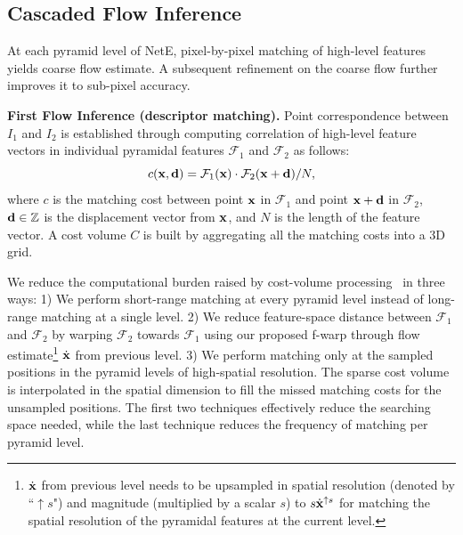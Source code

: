 \documentclass[10pt,twocolumn,letterpaper]{article}
\begin{document}
\subsection{Cascaded Flow Inference}
\label{sec:cascaded flow inference}
%
At each pyramid level of NetE, pixel-by-pixel matching of high-level features yields coarse flow estimate. A subsequent refinement on the coarse flow further improves it to sub-pixel accuracy.

\vspace{0.1cm}
\noindent \textbf{First Flow Inference (descriptor matching).} Point correspondence between $I_{1}$ and $I_{2}$ is established through computing correlation of high-level feature vectors in individual pyramidal features ${\mathcal F}_{1}$ and ${\mathcal F}_{2}$ as follows:
%
\begin{equation}\label{eq:matching cost}
c({\bf x},{\bf d}) = {\mathcal F}_{1}({\bf x}) \cdot {\mathcal F}_{2}({\bf x}+{\bf d}) / N,
\end{equation}
%
where $c$ is the matching cost between point ${\bf x}$ in ${\mathcal F}_{1}$ and point ${\bf x}+{\bf d}$ in ${\mathcal F}_{2}$, ${\bf d} \in {\mathbb Z}$ is the displacement vector from ${\bf x}$, and $N$ is the length of the feature vector. A cost volume $C$ is built by aggregating all the matching costs into a 3D grid.

We reduce the computational burden raised by cost-volume processing~\cite{Fischer15, Ilg17} in three ways: 1) We perform short-range matching at every pyramid level instead of long-range matching at a single level. 2) We reduce feature-space distance between ${\mathcal F}_{1}$ and ${\mathcal F}_{2}$ by warping ${\mathcal F}_{2}$ towards ${\mathcal F}_{1}$ using our proposed f-warp through flow estimate\footnote{$\dot{\bf x}$ from previous level needs to be upsampled in spatial resolution (denoted by ``$\uparrow$$s$") and magnitude (multiplied by a scalar $s$) to $s\dot{\bf x}^{\uparrow s}$ for matching the spatial resolution of the pyramidal features at the current level.} $\dot{\bf x}$ from previous level. 3) We perform matching only at the sampled positions in the pyramid levels of high-spatial resolution. The sparse cost volume is interpolated in the spatial dimension to fill the missed matching costs for the unsampled positions. The first two techniques effectively reduce the searching space needed, while the last technique reduces the frequency of matching per pyramid level. 
\end{document}
